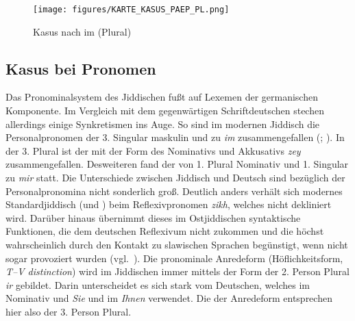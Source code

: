   

	\begin{figure}[t]
\texttt{[image: figures/KARTE\_KASUS\_PAEP\_PL.png]}
		\caption{\label{kartepaepPL} Kasus nach  im  (Plural)}
		\end{figure}
  	 
  
      \subsection{Kasus bei Pronomen}\label{kasuspron}
\largerpage[-1]
Das Pronominalsystem des Jiddischen fußt auf Lexemen der germanischen Komponente. Im Vergleich mit dem gegenwärtigen Schriftdeutschen stechen allerdings einige Synkretismen ins Auge. So sind im modernen Jiddisch die Personalpronomen der 3. Singular maskulin  und  zu  \textit{im} zusammengefallen (\citealt[115]{Wolf1969}; \citealt[185]{Jacobs2005}). In der 3. Plural ist der  mit der Form des Nominativs und Akkusativs  \textit{zey} zusammengefallen. Desweiteren fand der  von 1. Plural Nominativ und 1. Singular  zu  \textit{mir} statt. Die Unterschiede zwischen Jiddisch und Deutsch sind bezüglich der Personalpronomina nicht sonderlich groß. Deutlich anders verhält sich modernes Standardjiddisch (und \hai{{\NOJ}}) beim Reflexivpronomen  \textit{zikh}, welches nicht dekliniert wird. Darüber hinaus übernimmt dieses  im Ostjiddischen syntaktische Funktionen, die dem deutschen Reflexivum nicht zukommen  und die höchst wahrscheinlich durch den Kontakt zu slawischen Sprachen begünstigt, wenn nicht sogar provoziert wurden (vgl.\, \citealt[185]{Jacobs2005}). Die pronominale Anredeform (Höflichkeitsform, \textit{T–V distinction}) wird im Jiddischen immer mittels der Form der 2. Person Plural  \textit{ir} gebildet. Darin unterscheidet es sich stark vom Deutschen, welches im Nominativ und  \textit{Sie} und im  \textit{Ihnen} verwendet. Die  der Anredeform entsprechen hier also der 3. Person Plural.

